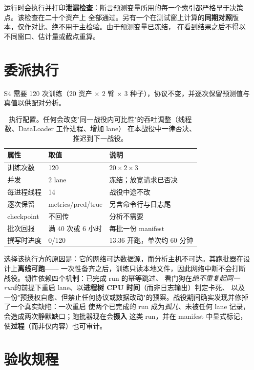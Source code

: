 \documentclass[conference]{IEEEtran}
\begin{document}
运行时会执行并打印\textbf{泄漏检查}：断言预测变量所用的每一个索引都严格早于决策点。该检查在二十个资产上
全部通过。另有一个在测试窗上计算的\textbf{同期对照}版本，仅作对比、绝不用于主检验。由于预测变量已冻结，
在看到结果之后不得以不同窗口、估计量或截点重算。

\section{委派执行}
\label{sec:exec}

S4 需要 120 次训练（$20$ 资产 $\times$ $2$ 臂 $\times$ $3$ 种子），协议不变，并逐次保留预测值与真值以供配对分析。

\begin{table}[!t]
\centering
\footnotesize
\setlength{\tabcolsep}{3pt}
\begin{tabular}{@{}p{}p{}p{}@{}}
\toprule
属性 & 取值 & 说明 \\
\midrule
训练次数 & 120 & $20 \times 2 \times 3$ \\
并发 & 2 lane & 冻结；放宽请求已否决 \\
每进程线程 & 14 & 战役中途不改 \\
逐次保留 & metrics/pred/true & 另含命令行与日志尾 \\
checkpoint & 不回传 & 分析不需要 \\
批次回报 & 满 40 次或 6 小时 & 每批一份 manifest \\
撰写时进度 & 0/120 & 13:36 开跑，单次约 60 分钟 \\
\bottomrule
\end{tabular}
\caption{执行配置。任何会改变"同一战役内可比性"的吞吐调整（线程数、DataLoader 工作进程、增加 lane）
在本战役中一律否决、推迟到下一战役。}
\label{tab:exec}
\end{table}

选择该执行方的原因是：它的网络可达数据源，而分析主机不可达。其跑批器在设计上\textbf{离线可跑}——
一次性备齐之后，训练只读本地文件，因此网络中断不会打断战役。韧性依赖四个机制：已完成 run 的幂等跳过、
看门狗在\emph{绝不重复起同一 run}的前提下重启 lane、以\textbf{进程树 CPU 时间}（而非日志输出）判定卡死、
以及一份"预授权自愈、但禁止任何协议或数据改动"的预案。战役期间确实发现并修掉了一个真实缺陷：一次重启
使两个已完成的 run 成为\emph{孤儿}、未被任何 lane 记录，会造成两次静默缺口；跑批器现在会\textbf{摄入}
这类 run，并在 manifest 中显式标记，使\textbf{过程}（而非仅内容）也可审计。

\section{验收规程}
\label{sec:verify}
\end{document}
